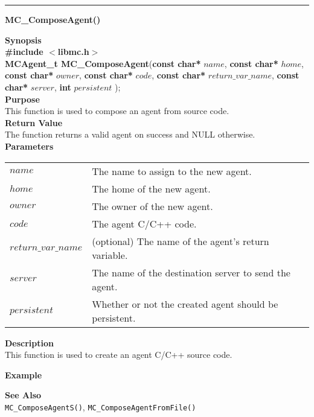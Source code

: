 \noindent
\vspace{5pt}
\rule{6.5in}{0.015in}
\noindent
{}
{\LARGE \bf MC\_ComposeAgent()}\\

\noindent
{\bf Synopsis}\\
{\bf \#include $<$libmc.h$>$}\\
{\bf MCAgent\_t MC\_ComposeAgent}({\bf const char*} $name$, 
                                  {\bf const char*} $home$,
                                  {\bf const char*} $owner$,
                                  {\bf const char*} $code$,
                                  {\bf const char*} $return\_var\_name$,
                                  {\bf const char*} $server$,
                                  {\bf int} $persistent$
																	);\\

\noindent
{\bf Purpose}\\
This function is used to compose an agent from source code.\\

\noindent
{\bf Return Value}\\
The function returns a valid agent on success and NULL otherwise.\\

\noindent
{\bf Parameters}
\vspace{-0.1in}
\begin{description}
\item
\begin{tabular}{p{30 mm}p{125 mm}} 
$name$ & The name to assign to the new agent.\\
$home$ & The home of the new agent.\\
$owner$ & The owner of the new agent.\\
$code$ & The agent C/C++ code.\\
$return\_var\_name$ & (optional) The name of the agent's return variable.\\
$server$ & The name of the destination server to send the agent.\\
$persistent$ & Whether or not the created agent should be persistent.\\
\end{tabular}
\end{description}

\noindent
{\bf Description}\\
This function is used to create an agent C/C++ source code. 

\noindent
{\bf Example}\\
\noindent
{\footnotesize}

\noindent
{\bf See Also}\\
\texttt{MC\_ComposeAgentS()}, \texttt{MC\_ComposeAgentFromFile()}

